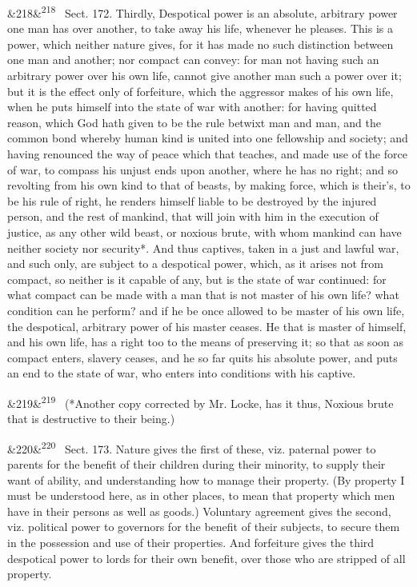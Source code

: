 \documentclass[12pt]{article}
\newcommand{\para}[1][]{\par\noindent\ifx&#1&\else\textsuperscript{\footnotesize #1}~\fi}
\begin{document}
\para[218] Sect. 172. Thirdly, Despotical power is an absolute, arbitrary power one man has over another, to take away his life, whenever he pleases. This is a power, which neither nature gives, for it has made no such distinction between one man and another; nor compact can convey: for man not having such an arbitrary power over his own life, cannot give another man such a power over it; but it is the effect only of forfeiture, which the aggressor makes of his own life, when he puts himself into the state of war with another: for having quitted reason, which God hath given to be the rule betwixt man and man, and the common bond whereby human kind is united into one fellowship and society; and having renounced the way of peace which that teaches, and made use of the force of war, to compass his unjust ends upon another, where he has no right; and so revolting from his own kind to that of beasts, by making force, which is their's, to be his rule of right, he renders himself liable to be destroyed by the injured person, and the rest of mankind, that will join with him in the execution of justice, as any other wild beast, or noxious brute, with whom mankind can have neither society nor security*. And thus captives, taken in a just and lawful war, and such only, are subject to a despotical power, which, as it arises not from compact, so neither is it capable of any, but is the state of war continued: for what compact can be made with a man that is not master of his own life? what condition can he perform? and if he be once allowed to be master of his own life, the despotical, arbitrary power of his master ceases. He that is master of himself, and his own life, has a right too to the means of preserving it; so that as soon as compact enters, slavery ceases, and he so far quits his absolute power, and puts an end to the state of war, who enters into conditions with his captive.

\para[219] (*Another copy corrected by Mr. Locke, has it thus, Noxious brute that is destructive to their being.)

\para[220] Sect. 173. Nature gives the first of these, viz. paternal power to parents for the benefit of their children during their minority, to supply their want of ability, and understanding how to manage their property. (By property I must be understood here, as in other places, to mean that property which men have in their persons as well as goods.) Voluntary agreement gives the second, viz. political power to governors for the benefit of their subjects, to secure them in the possession and use of their properties. And forfeiture gives the third despotical power to lords for their own benefit, over those who are stripped of all property.
\end{document}

